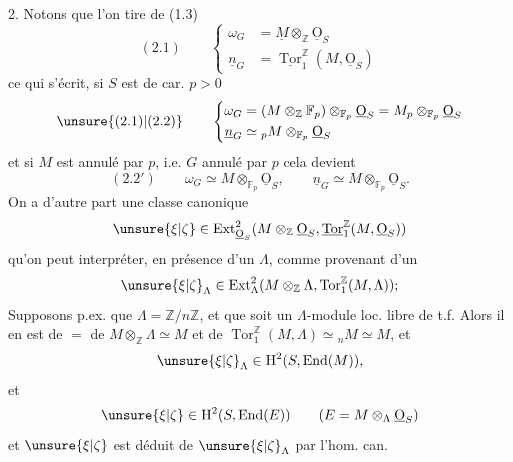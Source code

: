 2. Notons que  l'on tire de (1.3)
\[
(2.1)\qquad\left\{\begin{aligned}
\omega_G&=\underline M\otimes_{\mathbb Z}\underline{\mathrm O}_S\\
\underline n_G&=\underline{\operatorname{Tor}}_1^{\mathbb Z}(M,\underline{\mathrm O}_S)
\end{aligned}\right.
\]
ce qui s'écrit, si $S$ est de car. $p>0$
\[
\unsure{(2.1)|(2.2)}\qquad\left\{\begin{aligned}
\omega_G&=(M\otimes_{\mathbb Z}\mathbb F_p)\otimes_{\mathbb F_p}\underline{\mathrm O}_S=M_p\otimes_{\mathbb F_p}\underline{\mathrm O}_S\\
\underline n_G&\simeq {}_pM\otimes_{\mathbb F_p}\underline{\mathrm O}_S
\end{aligned}\right.
\]
et si $M$ est annulé par $p$, i.e. $G$ annulé par $p$ cela devient
\[
(2.2')\qquad \omega_G\simeq M\otimes_{\mathbb F_p}\underline{\mathrm O}_S,\qquad \underline n_G\simeq M\otimes_{\mathbb F_p}\underline{\mathrm O}_S.
\]
On a d'autre part une classe canonique
\[
\unsure{\xi|\zeta}\in\operatorname{Ext}^{2}_{\underline{\mathrm O}_S}(M\otimes_{\mathbb Z}\underline{\mathrm O}_S,\underline{\operatorname{Tor}}_1^{\mathbb Z}(M,\underline{\mathrm O}_S))
\]
qu'on peut interpréter, en présence d'un $\Lambda$, comme provenant d'un
\[
\unsure{\xi|\zeta}_\Lambda\in\operatorname{Ext}^{2}_{\Lambda}(M\otimes_{\mathbb Z}\Lambda,\operatorname{Tor}_1^{\mathbb Z}(M,\Lambda));
\]
Supposons p.ex. que $\Lambda=\mathbb Z/n\mathbb Z$, et que  soit un $\Lambda$-module loc. libre de t.f. Alors il en est de $=$ de $M\otimes_{\mathbb Z}\Lambda\simeq M$ et de $\operatorname{Tor}_1^{\mathbb Z}(M,\Lambda)\simeq{}_nM\simeq M$, et
\[
\unsure{\xi|\zeta}_\Lambda\in\mathrm H^2(S,\operatorname{End}(M)),
\]
et 
\[
\unsure{\xi|\zeta}\in\mathrm H^2(S,\operatorname{End}(E))\qquad(E=M\otimes_\Lambda\underline{\mathrm O}_S)
\]
et $\unsure{\xi|\zeta}$ est déduit de $\unsure{\xi|\zeta}_\Lambda$ par l'hom. can.
